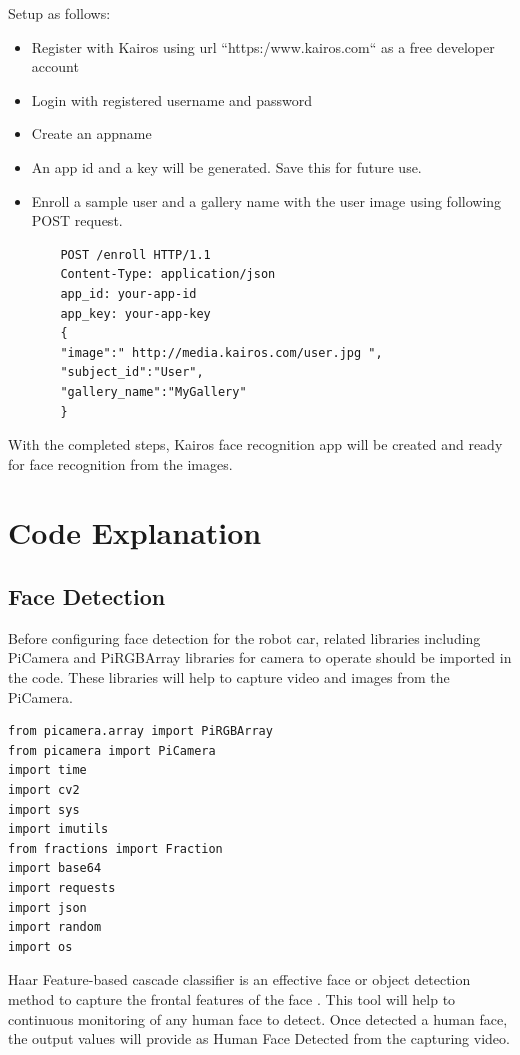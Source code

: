\documentclass[sigconf]{acmart}
\begin{document}
Setup as follows:

\begin{itemize}
\item Register with Kairos using url ``https:/www.kairos.com`` as a free developer account
\item Login with registered username and password
\item Create an appname
\item An app id and a key will be generated. Save this for future use.
\item Enroll a sample user and a gallery name with the user image using following POST request.


    \begin{verbatim}
    POST /enroll HTTP/1.1
    Content-Type: application/json
    app_id: your-app-id
    app_key: your-app-key
    {
    "image":" http://media.kairos.com/user.jpg ",
    "subject_id":"User",
    "gallery_name":"MyGallery"
    }
    \end{verbatim}
\end{itemize}


With the completed steps, Kairos face recognition app will be created and ready for face recognition from the images.

\section{Code Explanation}
\subsection{Face Detection}
Before configuring face detection for the robot car, related libraries including PiCamera and PiRGBArray libraries for camera to operate should be imported in the code. These libraries will help to capture video and images from the PiCamera.


\begin{verbatim}
from picamera.array import PiRGBArray
from picamera import PiCamera
import time
import cv2
import sys
import imutils
from fractions import Fraction
import base64
import requests
import json
import random
import os
\end{verbatim}


Haar Feature-based cascade classifier is an effective face or object detection method to capture the frontal features of the face \cite{viola2001}. This tool will help to continuous monitoring of any human face to detect. Once detected a human face, the output values will provide as Human Face Detected from the capturing video.
\end{document}
